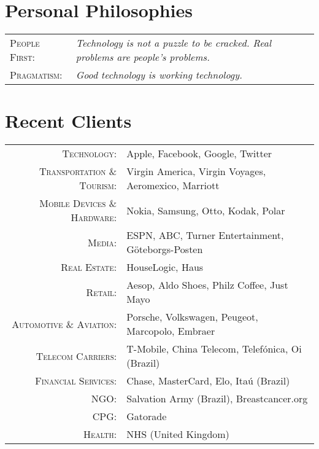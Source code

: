 \documentclass[a4paper,10pt]{article}
\begin{document}
\section{Personal Philosophies}
\begin{tabular}{ll}

  \textsc{People First:} & \emph{Technology is not a puzzle to be
    cracked. Real problems are people's problems.} \\

  \textsc{Pragmatism:} & \emph{Good technology is working technology.}
  
\end{tabular}


\section{Recent Clients}

\begin{tabular}{rl}
  \textsc{Technology:} &
    Apple,
    Facebook,
    Google,
    Twitter \\

  \textsc{Transportation \& Tourism:} &
    Virgin America,
    Virgin Voyages,
    Aeromexico,
    Marriott \\

  \textsc{Mobile Devices \& Hardware:} &

    Nokia,
    Samsung,
    Otto,
    Kodak,
    Polar \\

  \textsc{Media:} &

    ESPN,
    ABC,
    Turner Entertainment,
    G\"{o}teborgs-Posten \\

  \textsc{Real Estate:} &

    HouseLogic,
    Haus\\

  \textsc{Retail:} &

    Aesop,
    Aldo Shoes,
    Philz Coffee,
    Just Mayo\\

  \textsc{Automotive \& Aviation:} &

    Porsche,
    Volkswagen,
    Peugeot,
    Marcopolo,
    Embraer\\

  \textsc{Telecom Carriers:} &

    T-Mobile,
    China Telecom,
    Telef\'{o}nica,
    Oi (Brazil)\\

  \textsc{Financial Services:} &

    Chase,
    MasterCard,
    Elo,
    Ita\'{u} (Brazil)\\

  \textsc{NGO:} &

    Salvation Army (Brazil),
    Breastcancer.org\\
    
  \textsc{CPG:} &

    Gatorade\\

  \textsc{Health:} &

    NHS (United Kingdom)
\end{tabular}
\end{document}
